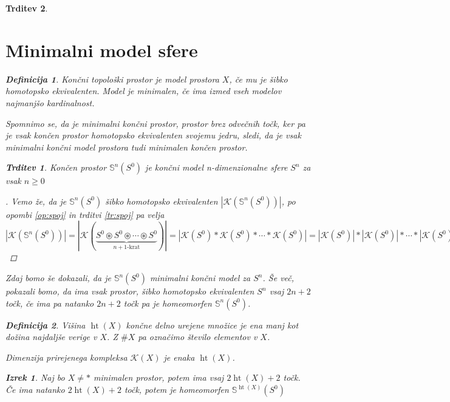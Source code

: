\documentclass[a4paper,12pt]{article}
\DeclareRobustCommand{\k}{
    \mathcal{K}
}
\DeclareMathOperator*{\htt}{ht}
\theoremstyle{definition}
\newtheorem{definicija}{Definicija}
\theoremstyle{plain}
\newtheorem{izrek}{Izrek}
\theoremstyle{definition}
\theoremstyle{plain}
\newtheorem{trditev}{Trditev}
\theoremstyle{plain}
\theoremstyle{plain}
\theoremstyle{plain}
\newenvironment{dokaz}{\begin{proof}[\bfseries\upshape\proofname]}{\end{proof}}
\begin{document}
\begin{trditev}
\section{Minimalni model sfere}


\begin{definicija}
    Končni topološki prostor je \textit{model} prostora $X$, če mu je šibko homotopsko ekvivalenten. Model je \textit{minimalen}, če ima izmed vseh modelov najmanjšo kardinalnost.
\end{definicija}

Spomnimo se, da je minimalni končni prostor, prostor brez odvečnih točk, ker pa je vsak končen prostor homotopsko ekvivalenten svojemu jedru, sledi, da je vsak minimalni končni model prostora tudi minimalen končen prostor.

\begin{trditev}
    Končen prostor $\mathds{S}^n(S^0)$ je končni model n-dimenzionalne sfere $S^n$ za vsak $n\geq 0$
\end{trditev}

\begin{dokaz}
    Vemo že, da je $\mathds{S}^n(S^0)$ šibko homotopsko ekvivalenten $|\k(\mathds{S}^n(S^0))|$,
    po opombi \ref{op:spoj} in trditvi \ref{tr:spoj} pa velja $|\k(\mathds{S}^n(S^0))|=|\k(\underbrace{S^0\circledast S^0 \circledast \cdots \circledast S^0}_\text{$n+1$-krat})|=
    |\k(S^0)\ast\k(S^0) \ast \cdots \ast \k(S^0)|=|\k(S^0)|\ast
    |\k(S^0)| \ast \cdots \ast |\k(S^0)|=S^0\ast
    S^0 \ast \cdots \ast S^0=S^n$
\end{dokaz}

Zdaj bomo še dokazali, da je $\mathds{S}^n(S^0)$ minimalni končni model za $S^n$. Še več, pokazali bomo, da ima vsak prostor, šibko homotopsko ekvivalenten $S^n$ vsaj $2n+2$ točk, če ima pa natanko $2n+2$ točk pa je homeomorfen $\mathds{S}^n(S^0)$.

\begin{definicija}
    \textit{Višina} $\htt(X)$ končne delno urejene množice je ena manj kot dožina najdaljše verige v $X$. Z $\# X$ pa označimo število elementov v $X$.
\end{definicija}
Dimenzija prirejenega kompleksa $\k(X)$ je enaka $\htt(X)$.


\begin{izrek}
    Naj bo $X\neq\ast$ minimalen prostor, potem ima vsaj $2\htt(X)+2$ točk. Če ima natanko $2\htt(X)+2$ točk, potem je homeomorfen $\mathds{S}^{\htt(X)}(S^0)$
\end{izrek}    


\end{trditev}
\end{document}
